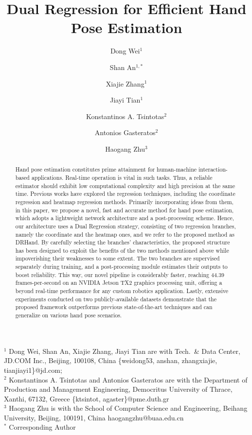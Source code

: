 \documentclass[11pt]{article}
\begin{document}
\title{Dual Regression for Efficient Hand Pose Estimation}
\author{
Dong Wei$^{1}$ \and
Shan An$^{1,\ast}$ \and
Xiajie Zhang$^{1}$ \and
Jiayi Tian$^{1}$ \and
Konstantinos A. Tsintotas$^{2}$ \and
Antonios Gasteratos$^{2}$ \and
Haogang Zhu$^{3}$
}
\date{}
\maketitle

\noindent
$^{1}$ Dong Wei, Shan An, Xiajie Zhang, Jiayi Tian are with Tech.\ \& Data Center, JD.COM Inc., Beijing, 100108, China \{weidong53, anshan, zhangxiajie, tianjiayi1\}@jd.com;\\
$^{2}$ Konstantinos A. Tsintotas and Antonios Gasteratos are with the Department of Production and Management Engineering, Democritus University of Thrace, Xanthi, 67132, Greece \{ktsintot, agaster\}@pme.duth.gr\\
$^{3}$ Haogang Zhu is with the School of Computer Science and Engineering, Beihang University, Beijing, 100191, China haogangzhu@buaa.edu.cn\\
$^{\ast}$ Corresponding Author

\begin{abstract}
Hand pose estimation constitutes prime attainment for human-machine interaction-based applications. Real-time operation is vital in such tasks. Thus, a reliable estimator should exhibit low computational complexity and high precision at the same time. Previous works have explored the regression techniques, including the coordinate regression and heatmap regression methods. Primarily incorporating ideas from them, in this paper, we propose a novel, fast and accurate method for hand pose estimation, which adopts a lightweight network architecture and a post-processing scheme. Hence, our architecture uses a Dual Regression strategy, consisting of two regression branches, namely the coordinate and the heatmap ones, and we refer to the proposed method as DRHand. By carefully selecting the branches’ characteristics, the proposed structure has been designed to exploit the benefits of the two methods mentioned above while impoverishing their weaknesses to some extent. The two branches are supervised separately during training, and a post-processing module estimates their outputs to boost reliability. This way, our novel pipeline is considerably faster, reaching 44.39 frames-per-second on an NVIDIA Jetson TX2 graphics processing unit, offering a beyond real-time performance for any custom robotics application. Lastly, extensive experiments conducted on two publicly-available datasets demonstrate that the proposed framework outperforms previous state-of-the-art techniques and can generalize on various hand pose scenarios.
\end{abstract}
\end{document}
